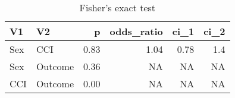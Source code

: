 \begin{table}

\caption{Fisher's exact test}
\centering
\begin{tabular}[t]{l|l|r|r|r|r}
\hline
V1 & V2 & p & odds\_ratio & ci\_1 & ci\_2\\
\hline
Sex & CCI & 0.83 & 1.04 & 0.78 & 1.4\\
\hline
Sex & Outcome & 0.36 & NA & NA & NA\\
\hline
CCI & Outcome & 0.00 & NA & NA & NA\\
\hline
\end{tabular}
\end{table}
